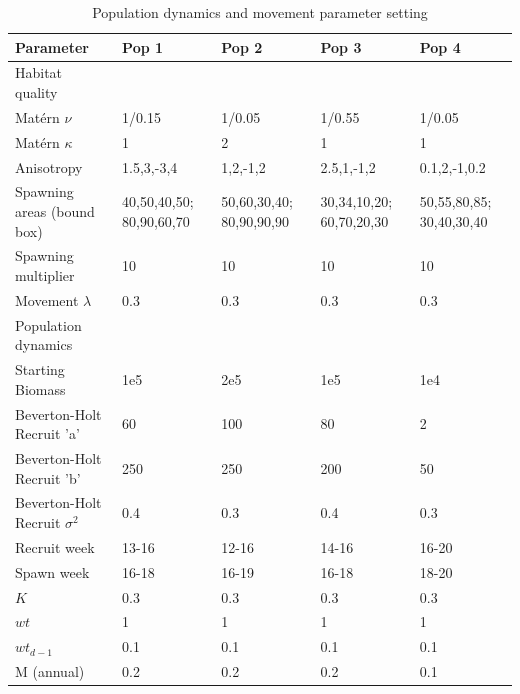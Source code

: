 \documentclass[review]{elsarticle}
\begin{document}
%
\begin{table}[!ht]
\caption{Population dynamics and movement parameter setting}
	\begin{tabular}{ p{4cm } p{2cm} p{2cm} p{2cm} p{2cm}}
	Parameter & Pop 1 & Pop 2 & Pop 3 & Pop 4 \\
	\hline
	Habitat quality & & & \\
	\hline
	Matérn $\nu$ & 1/0.15 & 1/0.05 & 1/0.55 & 1/0.05  \\
	Matérn $\kappa$ & 1 & 2 & 1 & 1  \\
	Anisotropy & 1.5,3,-3,4 & 1,2,-1,2 & 2.5,1,-1,2 & 0.1,2,-1,0.2 \\
	Spawning areas (bound box) & 40,50,40,50; 80,90,60,70 &
	50,60,30,40; 80,90,90,90 & 30,34,10,20; 60,70,20,30 & 50,55,80,85; 30,40,30,40 \\
	Spawning multiplier & 10 & 10 & 10 & 10 \\
	Movement $\lambda$ & 0.3 & 0.3 & 0.3 & 0.3 \\
	\hline
	Population dynamics & & & & \\
	\hline
	Starting Biomass & 1e5 & 2e5 & 1e5 & 1e4 \\
	Beverton-Holt Recruit 'a' & 60 & 100 & 80 & 2 \\
	Beverton-Holt Recruit 'b' & 250 & 250 & 200 & 50 \\
	Beverton-Holt Recruit $\sigma^2$ & 0.4 & 0.3 & 0.4 & 0.3 \\
	Recruit week & 13-16 & 12-16 & 14-16 & 16-20 \\
	Spawn week & 16-18 & 16-19 & 16-18 & 18-20 \\
	$K$ & 0.3 & 0.3 & 0.3 & 0.3 \\
	$wt$ & 1 & 1 & 1 & 1 \\
	$wt_{d-1}$ & 0.1 & 0.1 & 0.1 & 0.1 \\
	M (annual) & 0.2 & 0.2 & 0.2 & 0.1 \\
	\hline
\end{tabular}
\label{tab:1}
\end{table}
\end{document}
